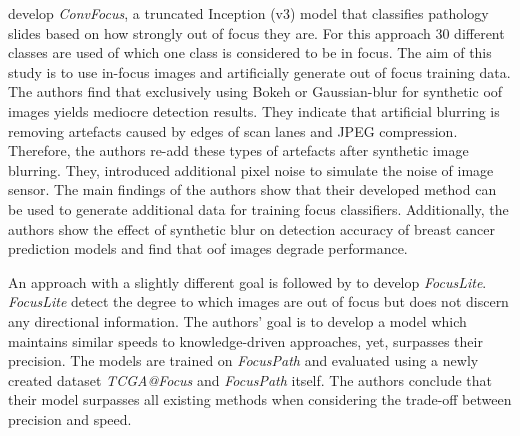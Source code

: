 \textcite{kohlberger2019wholeslide} develop \emph{ConvFocus}, a truncated Inception (v3) model that classifies pathology slides based on how strongly out of focus they are. For this approach 30 different classes are used of which one class is considered to be in focus. The aim of this study is to use in-focus images and artificially generate out of focus training data.
The authors find that exclusively using Bokeh or Gaussian-blur for synthetic \ac{oof} images yields mediocre detection results. They indicate that artificial blurring is removing artefacts caused by edges of scan lanes and JPEG compression. Therefore, the authors re-add these types of artefacts after synthetic image blurring. They, introduced additional pixel noise to simulate the noise of image sensor.
The main findings of the authors show that their developed method can be used to generate additional data for training focus classifiers. Additionally, the authors show the effect of synthetic blur on detection accuracy of breast cancer prediction models and find that \ac{oof} images degrade performance.

An approach with a slightly different goal is followed by \textcite{wang2020focuslitenn} to develop \emph{FocusLite}. \emph{FocusLite} detect the degree to which images are out of focus but does not discern any directional information. The authors' goal is to develop a model which maintains similar speeds to knowledge-driven approaches, yet, surpasses their precision. The models are trained on \emph{FocusPath} \cite{hosseini2019encoding} and evaluated using a newly created dataset \emph{TCGA@Focus} and \emph{FocusPath} itself.
The authors conclude that their model surpasses all existing methods when considering the trade-off between precision and speed.  


